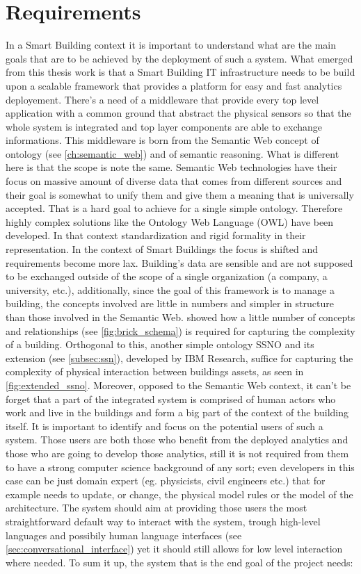 \section{Requirements} \label{sec:requirements}
In a Smart Building context it is important to understand what are the main goals that are to be achieved by the deployment of such a system. What emerged from this thesis work is that a Smart Building IT infrastructure needs to be build upon a scalable framework that provides a platform for easy and fast analytics deployement. There's a need of a middleware that provide every top level application with a common ground that abstract the physical sensors so that the whole system is integrated and top layer components are able to exchange informations. This middleware is born from the Semantic Web concept of ontology (see \autoref{ch:semantic_web}) and of semantic reasoning. What is different here is that the scope is note the same. Semantic Web technologies have their focus on massive amount of diverse data that comes from different sources and their goal is somewhat to unify them and give them a meaning that is universally accepted. That is a hard goal to achieve for a single simple ontology. Therefore highly complex solutions like the Ontology Web Language (OWL)\cite{owl_reccomendation} have been developed. In that context standardization and rigid formality in their representation. In the context of Smart Buildings the focus is shifted and requirements become more lax.
Building's data are sensible and are not supposed to be exchanged outside of the scope of a single organization (a company, a university, etc.), additionally, since the goal of this framework is to manage a building, the concepts involved are little in numbers and simpler in structure than those involved in the Semantic Web. \textcite{brick_schema} showed how a little number of concepts and relationships (see \autoref{fig:brick_schema}) is required for capturing the complexity of a building. Orthogonal to this, another simple ontology SSNO and its extension (see \autoref{subsec:ssn}), developed by IBM Research, suffice for capturing the complexity of physical interaction between buildings assets, as seen in \autoref{fig:extended_ssno}.
Moreover, opposed to the Semantic Web context, it can't be forget that a part of the integrated system is comprised of human actors who work and live in the buildings and form a big part of the context of the building itself. It is important to identify and focus on the potential users of such a system. Those users are both those who benefit from the deployed analytics and those who are going to develop those analytics, still it is not required from them to have a strong computer science background of any sort; even developers in this case can be just domain expert (eg. physicists, civil engineers etc.) that for example needs to update, or change, the physical model rules or the model of the architecture. The system should aim at providing those users the most straightforward default way to interact with the system, trough high-level languages and possibily human language interfaces (see \autoref{sec:conversational_interface}) yet it should still allows for low level interaction where needed. To sum it up, the system that is the end goal of the project needs:
